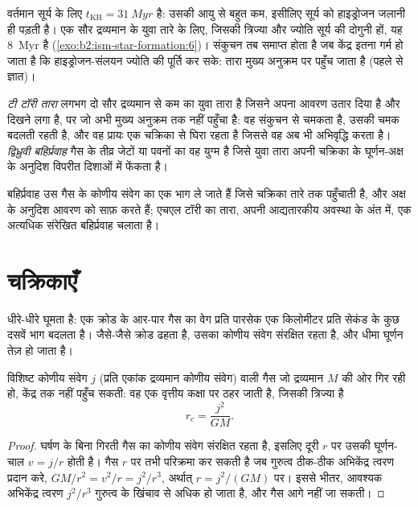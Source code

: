 वर्तमान सूर्य के लिए $t_{\mathrm{KH}} = \qty{31}{Myr}$ है: उसकी आयु से बहुत
कम, इसीलिए सूर्य को हाइड्रोजन जलानी ही पड़ती है। एक सौर द्रव्यमान के युवा तारे के लिए,
जिसकी त्रिज्या और ज्योति सूर्य की दोगुनी हों, यह \qty{8}{Myr} है
(\cref{exo:b2:ism-star-formation:6})। संकुचन तब समाप्त होता है जब केंद्र इतना गर्म हो जाता है कि हाइड्रोजन-संलयन
ज्योति की पूर्ति कर सके: तारा मुख्य अनुक्रम पर पहुँच जाता है (पहले से ज्ञात)।

\begin{definition}[टी टॉरी तारा, द्विध्रुवी बहिर्प्रवाह]\label{def:b2:ism-star-formation:t-tauri}
\emph{टी टॉरी तारा} लगभग दो सौर द्रव्यमान से कम का युवा तारा है
जिसने अपना आवरण उतार दिया है और दिखने लगा है, पर जो अभी
मुख्य अनुक्रम तक नहीं पहुँचा है: वह संकुचन से चमकता है, उसकी चमक
बदलती रहती है, और वह प्रायः एक चक्रिका से घिरा रहता है जिससे वह अब भी
अभिवृद्धि करता है। \emph{द्विध्रुवी बहिर्प्रवाह} गैस के तीव्र
जेटों या पवनों का वह युग्म है जिसे युवा तारा अपनी चक्रिका के घूर्णन-अक्ष के अनुदिश
विपरीत दिशाओं में फेंकता है।
\end{definition}

बहिर्प्रवाह उस गैस के कोणीय संवेग का एक भाग ले जाते हैं जिसे चक्रिका तारे तक
पहुँचाती है, और अक्ष के अनुदिश आवरण को साफ़ करते हैं; एचएल टॉरी का
तारा, अपनी आद्यतारकीय अवस्था के अंत में, एक अत्यधिक संरेखित बहिर्प्रवाह
चलाता है।

\section{चक्रिकाएँ}

 धीरे-धीरे घूमता है: एक क्रोड के आर-पार गैस का वेग प्रति पारसेक एक किलोमीटर
प्रति सेकंड के कुछ दसवें भाग बदलता है। जैसे-जैसे क्रोड ढहता है, उसका
कोणीय संवेग संरक्षित रहता है, और धीमा घूर्णन तेज़ हो जाता है।

\begin{proposition}[अपकेंद्री त्रिज्या]\label{prop:b2:ism-star-formation:centrifugal}
विशिष्ट कोणीय संवेग $j$ (प्रति एकांक द्रव्यमान कोणीय संवेग) वाली गैस
जो द्रव्यमान $M$ की ओर गिर रही हो, केंद्र तक नहीं पहुँच सकती: वह एक वृत्तीय
कक्षा पर ठहर जाती है, जिसकी त्रिज्या है
\[
  r_c = \frac{j^2}{G M}.
\]
\end{proposition}

\begin{proof}
घर्षण के बिना गिरती गैस का कोणीय संवेग संरक्षित रहता है, इसलिए
दूरी $r$ पर उसकी घूर्णन-चाल $v = j/r$ होती है। गैस $r$ पर तभी परिक्रमा कर सकती है जब
गुरुत्व ठीक-ठीक अभिकेंद्र त्वरण प्रदान करे,
$GM/r^2 = v^2/r = j^2/r^3$, अर्थात् $r = j^2/(GM)$ पर। इससे भीतर,
आवश्यक अभिकेंद्र त्वरण $j^2/r^3$ गुरुत्व के खिंचाव से अधिक हो जाता है, और
गैस आगे नहीं जा सकती।
\end{proof}

